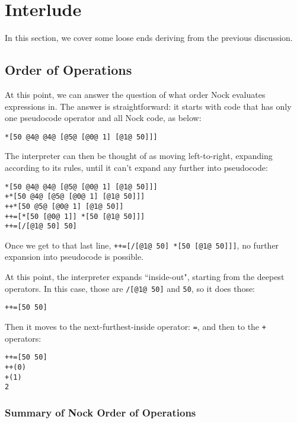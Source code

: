 \documentclass[twoside]{article}
\begin{document}
\section{Interlude}

In this section, we cover some loose ends deriving from the previous discussion.

\subsection{Order of Operations}

At this point, we can answer the question of what order Nock evaluates expressions in.  The answer is straightforward: it starts with code that has only one pseudocode operator and all Nock code, as below:

\begin{lstlisting}[style=listingcode]
*[50 @4@ @4@ [@5@ [@0@ 1] [@1@ 50]]]
\end{lstlisting}

\noindent{}
The interpreter can then be thought of as moving left-to-right, expanding according to its rules, until it can't expand any further into pseudocode:

\begin{lstlisting}[style=listingcode]
*[50 @4@ @4@ [@5@ [@0@ 1] [@1@ 50]]]
+*[50 @4@ [@5@ [@0@ 1] [@1@ 50]]]
++*[50 @5@ [@0@ 1] [@1@ 50]]
++=[*[50 [@0@ 1]] *[50 [@1@ 50]]]
++=[/[@1@ 50] 50]
\end{lstlisting}

\noindent{}
Once we get to that last line, \lstinline[style=inlinecode]{++=[/[@1@ 50] *[50 [@1@ 50]]]}, no further expansion into pseudocode is possible.

At this point, the interpreter expands ``inside-out", starting from the deepest operators. In this case, those are \lstinline[style=inlinecode]{/[@1@ 50]} and \lstinline[style=inlinecode]{50}, so it does those:

\begin{lstlisting}[style=listingcode]
++=[50 50]
\end{lstlisting}

\noindent{}
Then it moves to the next-furthest-inside operator: \lstinline[style=inlinecode]{=}, and then to the \lstinline[style=inlinecode]{+} operators:

\begin{lstlisting}[style=listingcode]
++=[50 50]
++(0)
+(1)
2
\end{lstlisting}

\subsubsection{Summary of Nock Order of Operations}
\end{document}
